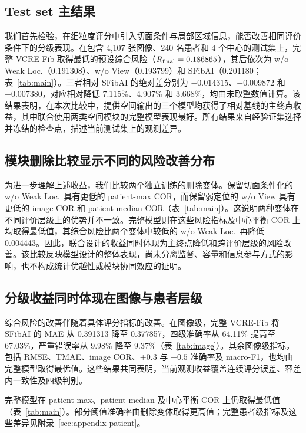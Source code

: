 \subsection{Test set 主结果}\label{sec:test}
我们首先检验，在细粒度评分中引入切面条件与局部区域信息，能否改善相同评价条件下的分级表现。在包含 4,107 张图像、240 名患者和 4 个中心的测试集上，完整 VCRE-Fib 取得最低的预设综合风险（$R_{\mathrm{final}}=0.186865$），其后依次为 w/o Weak Loc.（0.191308）、w/o View（0.193799）和 SFibAI（0.201180；表~\ref{tab:main}）。三者相对 SFibAI 的绝对差分别为 $-0.014315$、$-0.009872$ 和 $-0.007380$，对应相对降低 7.115\%、4.907\% 和 3.668\%，均由未取整数值计算。该结果表明，在本次比较中，提供空间输出的三个模型均获得了相对基线的主终点收益，其中联合使用两类空间模块的完整模型表现最好。所有结果来自经验证集选择并冻结的检查点，描述当前测试集上的观测差异。

\subsection{模块删除比较显示不同的风险改善分布}
为进一步理解上述收益，我们比较两个独立训练的删除变体。保留切面条件化的 w/o Weak Loc.\ 具有更低的 patient-max COR，而保留弱定位的 w/o View 具有更低的 image COR 和 patient-median COR（表~\ref{tab:main}）。这说明两种变体在不同评价层级上的优势并不一致。完整模型则在这些风险指标及中心平衡 COR 上均取得最低值，其综合风险比两个变体中较低的 w/o Weak Loc.\ 再降低 0.004443。因此，联合设计的收益同时体现为主终点降低和跨评价层级的风险改善。该比较反映模型设计的整体表现，尚未分离监督、容量和信息参与方式的影响，也不构成统计优越性或模块协同效应的证明。

\subsection{分级收益同时体现在图像与患者层级}
综合风险的改善伴随着具体评分指标的改善。在图像级，完整 VCRE-Fib 将 SFibAI 的 MAE 从 0.391313 降至 0.377857，四级准确率从 64.11\% 提高至 67.03\%，严重错误率从 9.98\% 降至 9.37\%（表~\ref{tab:image}）。其余图像级指标，包括 RMSE、TMAE、image COR、$\pm0.3$ 与 $\pm0.5$ 准确率及 macro-F1，也均由完整模型取得最优值。这些结果共同表明，当前观测收益覆盖连续评分误差、容差内一致性及四级判别。

完整模型在 patient-max、patient-median 及中心平衡 COR 上仍取得最低值（表~\ref{tab:main}）。部分阈值准确率由删除变体取得更高值；完整患者级指标及这些差异见附录~\ref{sec:appendix-patient}。

